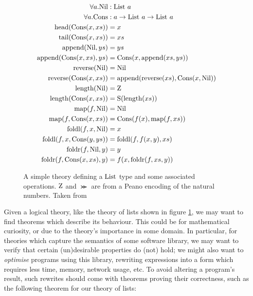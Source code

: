 \begin{figure}
  \begin{equation*}
    \begin{split}
      \forall a. \text{Nil}            &: \text{List} \ a                                  \\
      \forall a. \text{Cons}           &: a \rightarrow \text{List} \ a \rightarrow \text{List} \ a \\
      \text{head}(\text{Cons}(x, xs))        &= x                                       \\
      \text{tail}(\text{Cons}(x, xs))        &= xs                                      \\
      \text{append}(\text{Nil},         ys)  &= ys                                      \\
      \text{append}(\text{Cons}(x, xs), ys)  &= \text{Cons}(x, \text{append}(xs, ys))               \\
      \text{reverse}(\text{Nil})             &= \text{Nil}                                    \\
      \text{reverse}(\text{Cons}(x, xs))     &= \text{append}(\text{reverse}(xs), \text{Cons}(x, \text{Nil}))   \\
      \text{length}(\text{Nil})              &= \text{Z}                                   \\
      \text{length}(\text{Cons}(x, xs))      &= \text{S} (\text{length}(xs))                     \\
      \text{map}(f, \text{Nil})              &= \text{Nil}                                    \\
      \text{map}(f, \text{Cons}(x, xs))      &= \text{Cons}(f(x), \text{map}(f, xs))                \\
      \text{foldl}(f, x, \text{Nil})         &= x                                       \\
      \text{foldl}(f, x, \text{Cons}(y, ys)) &= \text{foldl}(f, f(x, y), xs)                  \\
      \text{foldr}(f, \text{Nil},         y) &= y                                       \\
      \text{foldr}(f, \text{Cons}(x, xs), y) &= f(x, \text{foldr}(f, xs, y))
    \end{split}
  \end{equation*}
  \caption{A simple theory defining a $\text{List}$ type and some associated
    operations. $\text{Z}$ and $\Succ$ are from a Peano encoding of the
    natural numbers. Taken from
    \cite{Johansson.Dixon.Bundy:conjecture-generation}}
  \label{figure:list_theory}
\end{figure}

Given a logical theory, like the theory of lists shown in figure
\ref{figure:list_theory}, we may want to find theorems which describe its
behaviour. This could be for mathematical curiosity, or due to the theory's
importance in some domain. In particular, for theories which capture the
semantics of some software library, we may want to verify that certain
(un)desirable properties do (not) hold; we might also want to \emph{optimise}
programs using this library, rewriting expressions into a form which requires
less time, memory, network usage, etc. To avoid altering a program's result,
such rewrites should come with theorems proving their correctness, such as the
following theorem for our theory of lists:

